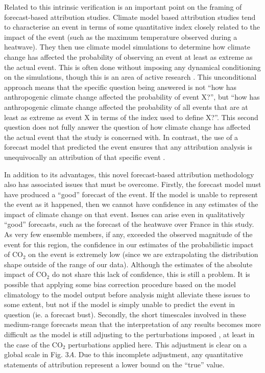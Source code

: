   Related to this intrinsic verification is an important point on the framing of forecast-based attribution studies. Climate model based attribution studies tend to characterise an event in terms of some quantitative index closely related to the impact of the event (such as the maximum temperature observed during a heatwave). They then use climate model simulations to determine how climate change has affected the probability of observing an event at least as extreme as the actual event. This is often done without imposing any dynamical conditioning on the simulations, though this is an area of active research \citep{yiou_statistical_2017,pall_diagnosing_2017}. This unconditional approach means that the specific question being answered is not ``how has anthropogenic climate change affected the probability of event X?'', but ``how has anthropogenic climate change affected the probability of all events that are at least as extreme as event X in terms of the index used to define X?''.  This second question does not fully answer the question of how climate change has affected the actual event that the study is concerned with. In contrast, the use of a forecast model that predicted the event ensures that any attribution analysis is unequivocally an attribution of that specific event \citep{hope_determining_2019}.
  
  In addition to its advantages, this novel forecast-based attribution methodology also has associated issues that must be overcome. Firstly, the forecast model must have produced a ``good'' forecast of the event. If the model is unable to represent the event as it happened, then we cannot have confidence in any estimates of the impact of climate change on that event. Issues can arise even in qualitatively ``good'' forecasts, such as the forecast of the heatwave over France in this study. As very few ensemble members, if any, exceeded the observed magnitude of the event for this region, the confidence in our estimates of the probabilistic impact of CO$_2$ on the event is extremely low (since we are extrapolating the distribution shape outside of the range of our data). Although the estimates of the absolute impact of CO$_2$ do not share this lack of confidence, this is still a problem. It is possible that applying some bias correction procedure \citep[e.g.][]{sippel_novel_2016,jeon_quantile-based_2016,li_reducing_2019} based on the model climatology to the model output before analysis might alleviate these issues to some extent, but not if the model is simply unable to predict the event in question (ie. a forecast bust). Secondly, the short timescales involved in these medium-range forecasts mean that the interpretation of any results becomes more difficult as the model is still adjusting to the perturbations imposed \citep{hope_contributors_2015}, at least in the case of the CO$_2$ perturbations applied here. This adjustment is clear on a global scale in Fig. $3A$. Due to this incomplete adjustment, any quantitative statements of attribution represent a lower bound on the ``true'' value. 
  
